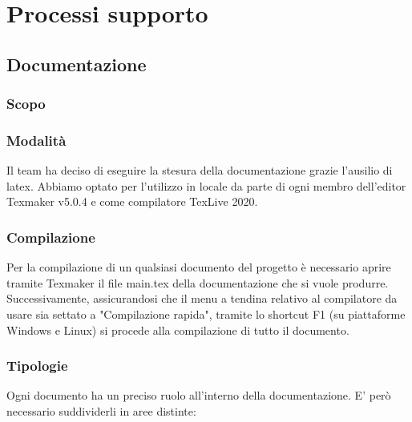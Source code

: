 \section{Processi supporto}
\subsection{Documentazione}
\subsubsection{Scopo}
\subsubsection{Modalità}
Il team ha deciso di eseguire la stesura della documentazione grazie l'ausilio di latex. Abbiamo optato per l'utilizzo in locale da parte di ogni membro dell'editor Texmaker v5.0.4 e come compilatore TexLive 2020.
\subsubsection{Compilazione}
Per la compilazione di un qualsiasi documento del progetto è necessario aprire tramite Texmaker il file main.tex della documentazione che si vuole produrre. Successivamente, assicurandosi che il menu a tendina relativo al compilatore da usare sia settato a "Compilazione rapida", tramite lo shortcut F1 (su piattaforme Windows e Linux) si procede alla compilazione di tutto il documento.
\subsubsection{Tipologie}
Ogni documento ha un preciso ruolo all'interno della documentazione. E' però necessario suddividerli in aree distinte:
